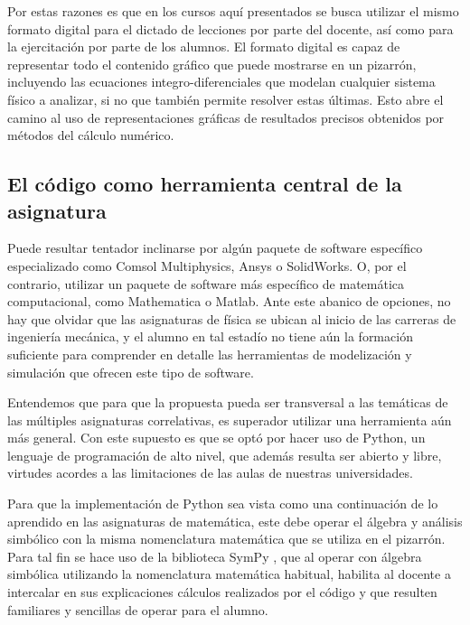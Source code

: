 \documentclass[a4paper]{fodami}        %
\begin{document}
Por estas razones es que en los cursos aquí presentados se busca utilizar el mismo formato digital para el dictado de lecciones por parte del docente, así como para la ejercitación por parte de los alumnos.
El formato digital es capaz de representar todo el contenido gráfico que puede mostrarse en un pizarrón, incluyendo las ecuaciones integro-diferenciales que modelan cualquier sistema físico a analizar, si no que también permite resolver estas últimas.
Esto abre el camino al uso de representaciones gráficas de resultados precisos obtenidos por métodos del cálculo numérico.



\subsection{El código como herramienta central de la asignatura}

Puede resultar tentador inclinarse por algún paquete de software específico especializado
como Comsol Multiphysics, Ansys o SolidWorks.
O, por el contrario, utilizar un paquete de software más específico de matemática computacional, como Mathematica o Matlab.
Ante este abanico de opciones, no hay que olvidar que las asignaturas de física se ubican al inicio de las carreras de ingeniería mecánica, y el alumno en tal estadío no tiene aún la formación suficiente para comprender en detalle las herramientas de modelización y simulación que ofrecen este tipo de software.

Entendemos que para que la propuesta pueda ser transversal a las temáticas de las múltiples asignaturas correlativas, es superador utilizar una herramienta aún más general. 
Con este supuesto es que se optó por hacer uso de Python, un lenguaje de programación de alto nivel, que además resulta ser abierto y libre, virtudes acordes a las limitaciones de las aulas de nuestras universidades.

Para que la implementación de Python sea vista como una continuación de lo aprendido en las asignaturas de matemática, este debe operar el álgebra y análisis simbólico con la misma nomenclatura matemática que se utiliza en el pizarrón.
Para tal fin se hace uso de la biblioteca SymPy \cite{sympy}, que al operar con álgebra simbólica utilizando la nomenclatura matemática habitual, habilita al docente a intercalar en sus explicaciones cálculos realizados por el código y que resulten familiares y sencillas de operar para el alumno.
\end{document}
